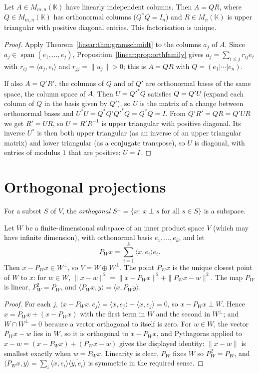 \begin{corollary}[$QR$ factorisation]\label{linear:cor:qr}
Let $A\in M_{m,n}(\mathbb K)$ have linearly independent columns. Then $A=QR$, where $Q\in M_{m,n}(\mathbb K)$ has orthonormal
columns ($Q^*Q=I_n$) and $R\in M_n(\mathbb K)$ is upper triangular with positive diagonal entries. This factorisation is
unique.
\end{corollary}
\begin{proof}
Apply Theorem~\ref{linear:thm:gramschmidt} to the columns $a_j$ of $A$. Since $a_j\in\operatorname{span}(e_1,\dots,e_j)$,
Proposition~\ref{linear:prop:orthfamily} gives $a_j=\sum_{i\le j}r_{ij}e_i$ with $r_{ij}=\langle a_j,e_i\rangle$ and
$r_{jj}=\|u_j\|>0$; this is $A=QR$ with $Q=(e_1|\cdots|e_n)$.

If also $A=Q'R'$, the columns of $Q$ and of $Q'$ are orthonormal bases of the same space, the column space of $A$.
Then $U=Q'^*Q$ satisfies $Q=Q'U$ (expand each column of $Q$ in the basis given by $Q'$), so $U$ is the matrix of a change
between orthonormal bases and $U^*U=Q^*Q'Q'^*Q=Q^*Q=I$. From $Q'R'=QR=Q'UR$ we get $R'=UR$, so $U=R'R^{-1}$ is upper
triangular with positive diagonal. Its inverse $U^*$ is then both upper triangular (as an inverse of an upper triangular
matrix) and lower triangular (as a conjugate transpose), so $U$ is diagonal, with entries of modulus $1$ that are
positive: $U=I$.
\end{proof}

\section{Orthogonal projections}

For a subset $S$ of $V$, the \emph{orthogonal} $S^\perp=\{x:\ x\perp s\text{ for all }s\in S\}$ is a subspace.

\begin{theorem}\label{linear:thm:projection}
Let $W$ be a finite-dimensional subspace of an inner product space $V$ (which may have infinite dimension), with
orthonormal basis $e_1,\dots,e_k$, and let
\[
P_Wx=\sum_{i=1}^k\langle x,e_i\rangle e_i.
\]
Then $x-P_Wx\in W^\perp$, so $V=W\oplus W^\perp$. The point $P_Wx$ is the unique closest point of $W$ to $x$: for
$w\in W$, $\|x-w\|^2=\|x-P_Wx\|^2+\|P_Wx-w\|^2$. The map $P_W$ is linear, $P_W^2=P_W$, and
$\langle P_Wx,y\rangle=\langle x,P_Wy\rangle$.
\end{theorem}
\begin{proof}
For each $j$, $\langle x-P_Wx,e_j\rangle=\langle x,e_j\rangle-\langle x,e_j\rangle=0$, so $x-P_Wx\perp W$. Hence
$x=P_Wx+(x-P_Wx)$ with the first term in $W$ and the second in $W^\perp$; and $W\cap W^\perp=0$ because a vector
orthogonal to itself is zero. For $w\in W$, the vector $P_Wx-w$ lies in $W$, so it is orthogonal to $x-P_Wx$, and
Pythagoras applied to $x-w=(x-P_Wx)+(P_Wx-w)$ gives the displayed identity: $\|x-w\|$ is smallest exactly when $w=P_Wx$.
Linearity is clear, $P_W$ fixes $W$ so $P_W^2=P_W$, and $\langle P_Wx,y\rangle=\sum_i\langle x,e_i\rangle\overline{\langle
y,e_i\rangle}$ is symmetric in the required sense.
\end{proof}

